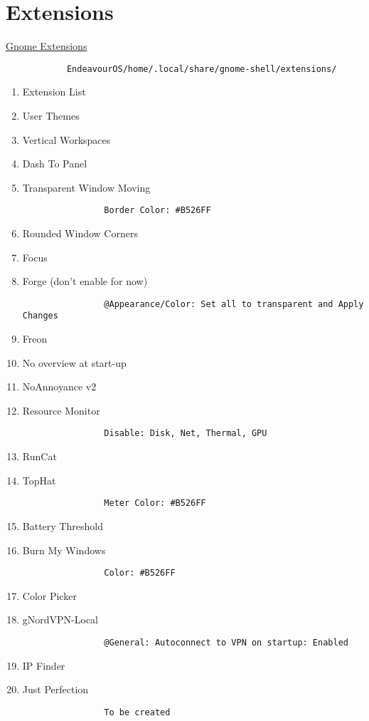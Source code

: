 \documentclass[12pt]{article}
\begin{document}
    \section{Extensions}\label{sec:extensions}
        \href{https://extensions.gnome.org/}{Gnome Extensions}
        \begin{verbatim}
            EndeavourOS/home/.local/share/gnome-shell/extensions/
        \end{verbatim}
        \begin{enumerate}
            \item Extension List
            \item User Themes
            \item Vertical Workspaces
            \item Dash To Panel
            \item Transparent Window Moving
            \begin{verbatim}
                Border Color: #B526FF
            \end{verbatim}
            \item Rounded Window Corners
            \item Focus
            \item Forge (don't enable for now)
            \begin{verbatim}
                @Appearance/Color: Set all to transparent and Apply Changes
            \end{verbatim}
            \item Freon
            \item No overview at start-up
            \item NoAnnoyance v2
            \item Resource Monitor
            \begin{verbatim}
                Disable: Disk, Net, Thermal, GPU
            \end{verbatim}
            \item RunCat
            \item TopHat
            \begin{verbatim}
                Meter Color: #B526FF
            \end{verbatim}
            \item Battery Threshold
            \item Burn My Windows
            \begin{verbatim}
                Color: #B526FF
            \end{verbatim}
            \item Color Picker
            \item gNordVPN-Local
            \begin{verbatim}
                @General: Autoconnect to VPN on startup: Enabled
            \end{verbatim}
            \item IP Finder
            \item Just Perfection
            \begin{verbatim}
                To be created
            \end{verbatim}
        \end{enumerate}
\end{document}
